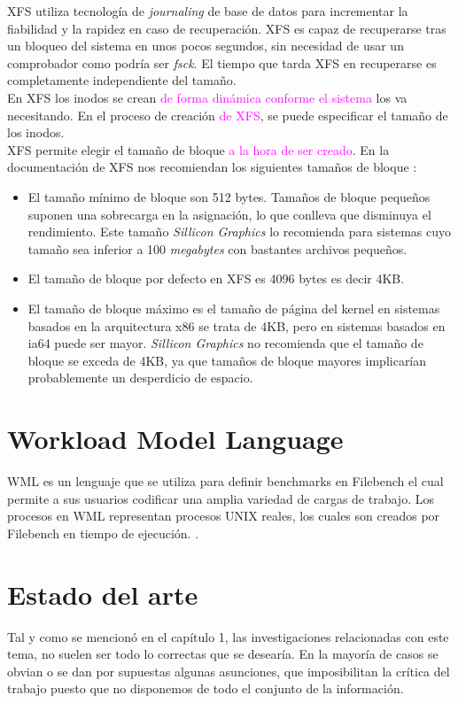 XFS utiliza tecnología de \textit{journaling} de base de datos para incrementar la fiabilidad y la rapidez en caso de recuperación. XFS es capaz de recuperarse tras un bloqueo del sistema en unos pocos segundos, sin necesidad de usar un comprobador como podría ser \textit{fsck}. El tiempo que tarda XFS en recuperarse es completamente independiente del tamaño.\\

En XFS los inodos se crean \textcolor{magenta}{de forma dinámica conforme el sistema} los va necesitando. En el proceso de creación \textcolor{magenta}{de XFS}, se puede especificar el tamaño de los inodos.\\

XFS permite elegir el tamaño de bloque \textcolor{magenta}{ a la hora de ser creado}. En la documentación de XFS nos recomiendan los siguientes tamaños de bloque \cite{xfs}:

\begin{itemize}
    \item El tamaño mínimo de bloque son 512 bytes. Tamaños de bloque pequeños suponen una sobrecarga en la asignación, lo que conlleva que disminuya el rendimiento. Este tamaño \textit{Sillicon Graphics} lo recomienda para sistemas cuyo tamaño sea inferior a 100 \textit{megabytes} con bastantes archivos pequeños.
    
    \item El tamaño de bloque por defecto en XFS es 4096 bytes es decir 4KB.
    \item El tamaño de bloque máximo es el tamaño de página del kernel en sistemas basados en la arquitectura x86 se trata de 4KB, pero en sistemas basados en ia64 puede ser mayor. \textit{Sillicon Graphics} no recomienda que el tamaño de bloque se exceda de 4KB, ya que tamaños de bloque mayores implicarían probablemente un desperdicio de espacio.
\end{itemize}

\section{Workload Model Language}
WML es un lenguaje que se utiliza para definir benchmarks en Filebench el cual permite a sus usuarios codificar una amplia variedad de cargas de trabajo. Los procesos en WML representan procesos UNIX reales, los cuales son creados por Filebench en tiempo de ejecución. \cite{Tarasov2016FilebenchAF}. 


\section{Estado del arte} \label{estado}
Tal y como se mencionó en el capítulo 1, las investigaciones relacionadas con este tema, no suelen ser todo lo correctas que se desearía. En la mayoría de casos se obvian o se dan por supuestas algunas asunciones, que imposibilitan la crítica del trabajo puesto que no disponemos de todo el conjunto de la información. \\

